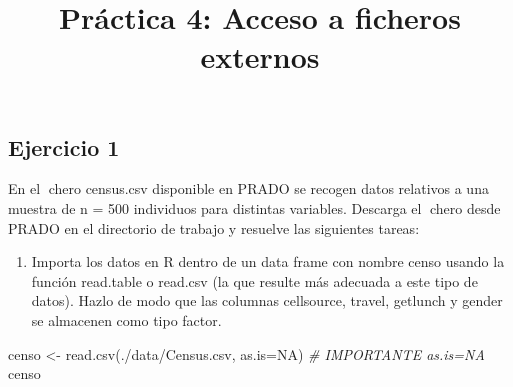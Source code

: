 \documentclass[
]{article}
\title{Práctica 4: Acceso a ficheros externos}
\author{}
\date{\vspace{-2.5em}}
\newenvironment{Shaded}{\begin{snugshade}}{\end{snugshade}}
\newcommand{\AttributeTok}[1]{\textcolor[rgb]{0.77,0.63,0.00}{#1}}
\newcommand{\CommentTok}[1]{\textcolor[rgb]{0.56,0.35,0.01}{\textit{#1}}}
\newcommand{\ConstantTok}[1]{\textcolor[rgb]{0.00,0.00,0.00}{#1}}
\newcommand{\FunctionTok}[1]{\textcolor[rgb]{0.00,0.00,0.00}{#1}}
\newcommand{\NormalTok}[1]{#1}
\newcommand{\OtherTok}[1]{\textcolor[rgb]{0.56,0.35,0.01}{#1}}
\newcommand{\StringTok}[1]{\textcolor[rgb]{0.31,0.60,0.02}{#1}}
\providecommand{\tightlist}{%
  \setlength{\itemsep}{0pt}\setlength{\parskip}{0pt}}
\begin{document}
\maketitle

\hypertarget{ejercicio-1}{%
\subsection{Ejercicio 1}\label{ejercicio-1}}

En el chero census.csv disponible en PRADO se recogen datos relativos a
una muestra de n = 500 individuos para distintas variables. Descarga el
chero desde PRADO en el directorio de trabajo y resuelve las siguientes
tareas:

\begin{enumerate}
\def\labelenumi{\arabic{enumi}.}
\tightlist
\item
  Importa los datos en R dentro de un data frame con nombre censo usando
  la función read.table o read.csv (la que resulte más adecuada a este
  tipo de datos). Hazlo de modo que las columnas cellsource, travel,
  getlunch y gender se almacenen como tipo factor.
\end{enumerate}

\begin{Shaded}
\begin{Highlighting}[]
\NormalTok{censo }\OtherTok{\textless{}{-}} \FunctionTok{read.csv}\NormalTok{(}\StringTok{\textquotesingle{}./data/Census.csv\textquotesingle{}}\NormalTok{, }\AttributeTok{as.is=}\ConstantTok{NA}\NormalTok{)  }\CommentTok{\# IMPORTANTE as.is=NA}
\NormalTok{censo}
\end{Highlighting}
\end{Shaded}
\end{document}
